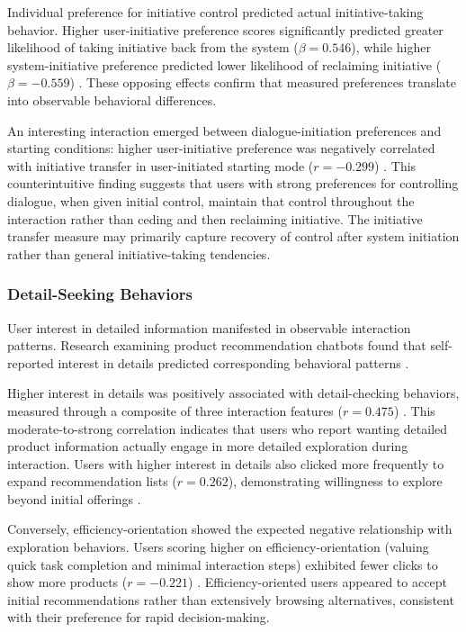 \documentclass[manuscript,anonymous,sigconf]{acmart}
\begin{document}
Individual preference for initiative control predicted actual initiative-taking behavior. Higher user-initiative preference scores significantly predicted greater likelihood of taking initiative back from the system ($\beta = 0.546$), while higher system-initiative preference predicted lower likelihood of reclaiming initiative ($\beta = -0.559$) \cite{A42}. These opposing effects confirm that measured preferences translate into observable behavioral differences.

An interesting interaction emerged between dialogue-initiation preferences and starting conditions: higher user-initiative preference was negatively correlated with initiative transfer in user-initiated starting mode ($r = -0.299$) \cite{A42}. This counterintuitive finding suggests that users with strong preferences for controlling dialogue, when given initial control, maintain that control throughout the interaction rather than ceding and then reclaiming initiative. The initiative transfer measure may primarily capture recovery of control after system initiation rather than general initiative-taking tendencies.

\subsubsection{Detail-Seeking Behaviors}

User interest in detailed information manifested in observable interaction patterns. Research examining product recommendation chatbots found that self-reported interest in details predicted corresponding behavioral patterns \cite{A42}.

Higher interest in details was positively associated with detail-checking behaviors, measured through a composite of three interaction features ($r = 0.475$) \cite{A42}. This moderate-to-strong correlation indicates that users who report wanting detailed product information actually engage in more detailed exploration during interaction. Users with higher interest in details also clicked more frequently to expand recommendation lists ($r = 0.262$), demonstrating willingness to explore beyond initial offerings \cite{A42}.

Conversely, efficiency-orientation showed the expected negative relationship with exploration behaviors. Users scoring higher on efficiency-orientation (valuing quick task completion and minimal interaction steps) exhibited fewer clicks to show more products ($r = -0.221$) \cite{A42}. Efficiency-oriented users appeared to accept initial recommendations rather than extensively browsing alternatives, consistent with their preference for rapid decision-making.
\end{document}
